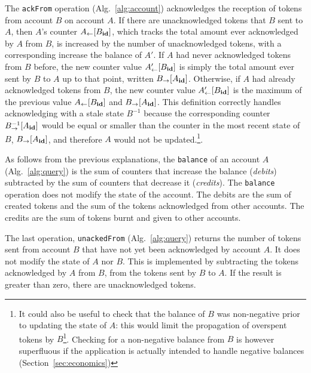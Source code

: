 \documentclass[9pt]{article}   	%
\begin{document}
The \texttt{ackFrom} operation (Alg.~\ref{alg:account}) acknowledges the reception of tokens from account $B$ on account $A$. If there are unacknowledged tokens that $B$ sent to $A$,
then $A$'s counter $A_{\leftarrow}[B_{\scriptsize \textbf{id}}]$, which tracks the total amount ever acknowledged by $A$ from $B$, is increased by the number of unacknowledged tokens, with a corresponding increase the balance of $A'$. If $A$ had never acknowledged tokens from $B$ before, the new counter value  $A'_{\leftarrow}[B_{\scriptsize \textbf{id}}]$ is simply the total amount ever sent by $B$ to $A$ up to that point, written $B_{\rightarrow}[A_{\scriptsize \textbf{id}}]$. Otherwise, if $A$ had already acknowledged tokens from $B$, the new counter value  $A'_{\leftarrow}[B_{\scriptsize \textbf{id}}]$ is the maximum of the previous value $A_{\leftarrow}[B_{\scriptsize \textbf{id}}]$ and $B_{\rightarrow}[A_{\scriptsize \textbf{id}}]$. This definition correctly handles acknowledging with a stale state  $B^{-1}$ because the corresponding counter $B^{-1}_{\rightarrow}[A_{\scriptsize \textbf{id}}]$ would be equal or smaller than the counter in the most recent state of $B$, $B_{\rightarrow}[A_{\scriptsize \textbf{id}}]$, and therefore $A$ would not be updated.\footnote{It could also be useful to check that the balance of $B$ was non-negative prior to updating the state of $A$: this would limit the propagation of overspent tokens by $B$\footnote{ This would not completely prevent the propagation because different accounts may have individually acknowledged tokens from B before B's state would reflect the overspending.}. Checking for a non-negative balance from $B$ is however superfluous if the application is actually intended to handle negative balances (Section~\ref{sec:economics})}.

As follows from the previous explanations, the \texttt{balance} of an account $A$ (Alg.~\ref{alg:query}) is the sum of counters that increase the balance (\textit{debits}) subtracted by the sum of counters that decrease it (\textit{credits}). The \texttt{balance} operation does not modify the state of the account. The debits are the sum of created tokens and the sum of the tokens acknowledged from other accounts. The credits are the sum of tokens burnt and given to other accounts.

The last operation, \texttt{unackedFrom} (Alg.~\ref{alg:query})  returns the number of tokens sent from account $B$ that have not yet been acknowledged by account $A$. It does not modify the state of $A$ nor $B$. This is implemented by subtracting the tokens acknowledged by $A$ from $B$, from the tokens sent by $B$ to $A$. If the result is greater than zero, there are unacknowledged tokens.
\end{document}
